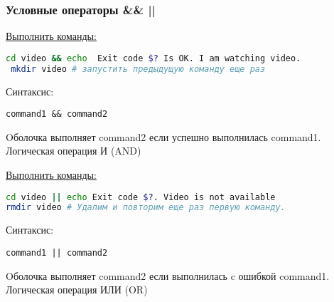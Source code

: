 \begin{frame}[fragile]
\frametitle{Условные операторы \&\& ||}

\underline{Выполнить команды:}
\begin{lstlisting}[language=bash]
 cd video && echo  Exit code $? Is OK. I am watching video.
 mkdir video # запустить предыдущую команду еще раз
\end{lstlisting}

\pause

Синтаксис:
\begin{verbatim}
command1 && command2
\end{verbatim}
Oболочка выполняет command2 если \alert{успешно} выполнилась command1. Логическая операция И (AND)
\pause

\underline{Выполнить команды:}
\pause
\begin{lstlisting}[language=bash]
cd video || echo Exit code $?. Video is not available 
rmdir video # Удалим и повторим еще раз первую команду.
\end{lstlisting}

\pause

Синтаксис:
\begin{verbatim}
command1 || command2
\end{verbatim}
Oболочка выполняет command2 если выполнилась c \alert{ошибкой} command1. Логическая операция ИЛИ (OR)
\end{frame}

